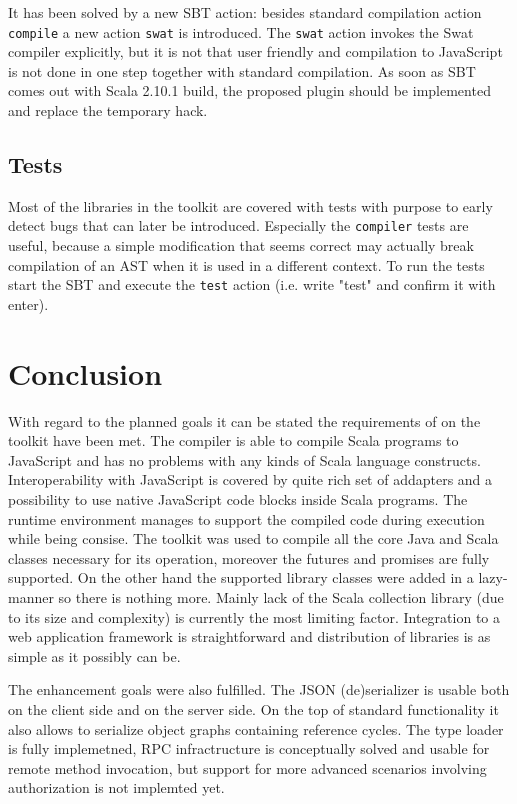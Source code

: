 \documentclass[12pt,a4paper]{report}
\begin{document}
It has been solved by a new SBT action: besides standard compilation action \texttt{compile} a new action \texttt{swat} is introduced. The \texttt{swat} action invokes the Swat compiler explicitly, but it is not that user friendly and compilation to JavaScript is not done in one step together with standard compilation. As soon as SBT comes out with Scala 2.10.1 build, the proposed plugin should be implemented and replace the temporary hack.

\section{Tests}

Most of the libraries in the toolkit are covered with tests with purpose to early detect bugs that can later be introduced. Especially the \texttt{compiler} tests are useful, because a simple modification that seems correct may actually break compilation of an AST when it is used in a different context. To run the tests start the SBT and execute the \texttt{test} action (i.e. write "test" and confirm it with enter).



\chapter{Conclusion}

With regard to the planned goals it can be stated the requirements of on the toolkit have been met. The compiler is able to compile Scala programs to JavaScript and has no problems with any kinds of Scala language constructs. Interoperability with JavaScript is covered by quite rich set of addapters and a possibility to use native JavaScript code blocks inside Scala programs. The runtime environment manages to support the compiled code during execution while being consise. The toolkit was used to compile all the core Java and Scala classes necessary for its operation, moreover the futures and promises are fully supported. On the other hand the supported library classes were added in a lazy-manner so there is nothing more. Mainly lack of the Scala collection library (due to its size and complexity) is currently the most limiting factor. Integration to a web application framework is straightforward and distribution of libraries is as simple as it possibly can be.

The enhancement goals were also fulfilled. The JSON (de)serializer is usable both on the client side and on the server side. On the top of standard functionality it also allows to serialize object graphs containing reference cycles. The type loader is fully implemetned, RPC infractructure is conceptually solved and usable for remote method invocation, but support for more advanced scenarios involving authorization is not implemted yet.
\end{document}

